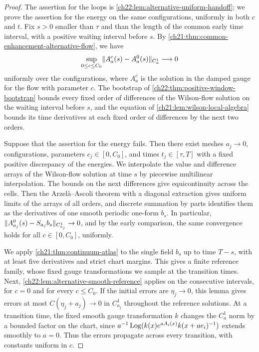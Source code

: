 \begin{proof}
The assertion for the loops is \cref{ch22:lem:alternative-uniform-handoff}; we prove the assertion for the energy on the same configurations, uniformly in both $c$ and $t$. Fix $s>0$ smaller than $\tau$ and than the length of the common early time interval, with a positive waiting interval before $s$. By \cref{ch21:thm:common-enhancement-alternative-flow}, we have
\[
 \sup_{0\le c\le C_0}\lVert A^c_a(s)-A^0_a(s)\rVert_{C_a^1}\longrightarrow0
\]
uniformly over the configurations, where $A^c_a$ is the solution in the damped gauge for the flow with parameter $c$. The bootstrap of \cref{ch22:thm:positive-window-bootstrap} bounds every fixed order of differences of the Wilson-flow solution on the waiting interval before $s$, and the equation of \cref{ch21:lem:wilson-local-algebra} bounds its time derivatives at each fixed order of differences by the next two orders.

Suppose that the assertion for the energy fails. Then there exist meshes $a_j\to0$, configurations, parameters $c_j\in[0,C_0]$, and times $t_j\in[\tau,T]$ with a fixed positive discrepancy of the energies. We interpolate the value and difference arrays of the Wilson-flow solution at time $s$ by piecewise multilinear interpolation. The bounds on the next differences give equicontinuity across the cells. Then the Arzel\`a--Ascoli theorem with a diagonal extraction gives uniform limits of the arrays of all orders, and discrete summation by parts identifies them as the derivatives of one smooth periodic one-form $b_s$. In particular, $\lVert A^0_{a_j}(s)-S_{a_j}b_s\rVert_{C_{a_j}^1}\to0$, and by the early comparison, the same convergence holds for all $c\in[0,C_0]$, uniformly.

We apply \cref{ch21:thm:continuum-atlas} to the single field $b_s$ up to time $T-s$, with at least five derivatives and strict chart margins. This gives a finite reference family, whose fixed gauge transformations we sample at the transition times. Next, \cref{ch22:lem:alternative-smooth-reference} applies on the consecutive intervals, for $c=0$ and for every $c\le C_0$. If the initial errors are $\eta_j\to0$, this lemma gives errors at most $C(\eta_j+a_j)\to0$ in $C_{a_j}^1$ throughout the reference solutions. At a transition time, the fixed smooth gauge transformation $k$ changes the $C_a^1$ norm by a bounded factor on the chart, since $a^{-1}\operatorname{Log}(k(x)e^{aA_i(x)}k(x+ae_i)^{-1})$ extends smoothly to $a=0$. Thus the errors propagate across every transition, with constants uniform in $c$.


\end{proof}
